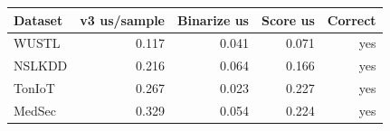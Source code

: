 \begin{tabular}{lrrrr}
\toprule
Dataset & v3 us/sample & Binarize us & Score us & Correct \\
\midrule
WUSTL & 0.117 & 0.041 & 0.071 & yes \\
NSLKDD & 0.216 & 0.064 & 0.166 & yes \\
TonIoT & 0.267 & 0.023 & 0.227 & yes \\
MedSec & 0.329 & 0.054 & 0.224 & yes \\
\bottomrule
\end{tabular}
